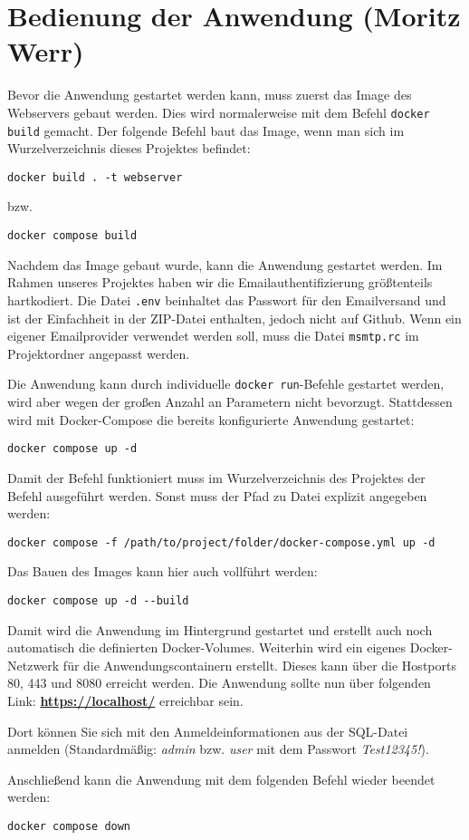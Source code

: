 \chapter{Bedienung der Anwendung (Moritz Werr)}

Bevor die Anwendung gestartet werden kann, muss zuerst das Image des Webservers gebaut werden. Dies wird normalerweise mit dem Befehl  \lstinline|docker build| gemacht. Der folgende Befehl baut das Image, wenn man sich im Wurzelverzeichnis dieses Projektes befindet: 
\begin{verbatim}
docker build . -t webserver
\end{verbatim}

 bzw.
\begin{verbatim}
docker compose build
\end{verbatim}

Nachdem das Image gebaut wurde, kann die Anwendung gestartet werden. Im Rahmen unseres Projektes haben wir die Emailauthentifizierung größtenteils hartkodiert. Die Datei  \lstinline|.env| beinhaltet das Passwort für den Emailversand und ist der Einfachheit in der ZIP-Datei enthalten, jedoch nicht auf Github. Wenn ein eigener Emailprovider verwendet werden soll, muss die Datei  \lstinline|msmtp.rc| im Projektordner angepasst werden.

Die Anwendung kann durch individuelle  \lstinline|docker run|-Befehle gestartet werden, wird aber wegen der großen Anzahl an Parametern nicht bevorzugt. Stattdessen wird mit Docker-Compose die bereits konfigurierte Anwendung gestartet: 
\begin{verbatim} 
docker compose up -d
\end{verbatim}

Damit der Befehl funktioniert muss im Wurzelverzeichnis des Projektes der Befehl ausgeführt werden. Sonst muss der Pfad zu Datei explizit angegeben werden: 
\begin{verbatim} 
docker compose -f /path/to/project/folder/docker-compose.yml up -d
\end{verbatim}
 Das Bauen des Images kann hier auch vollführt werden:  
\begin{verbatim} 
docker compose up -d --build
\end{verbatim}

Damit wird die Anwendung im Hintergrund gestartet und erstellt auch noch automatisch die definierten Docker-Volumes. Weiterhin wird ein eigenes Docker-Netzwerk für die Anwendungscontainern erstellt. Dieses kann über die Hostports 80, 443 und 8080 erreicht werden. Die Anwendung sollte nun über folgenden Link:  \href{https://localhost/}{\textbf{https://localhost/}} erreichbar sein. 

Dort können Sie sich mit den Anmeldeinformationen aus der SQL-Datei anmelden (Standardmäßig: \textit{admin} bzw. \textit{user} mit dem Passwort \textit{Test12345!}).

Anschließend kann die Anwendung mit dem folgenden Befehl wieder beendet werden: 
\begin{verbatim} 
docker compose down
\end{verbatim}